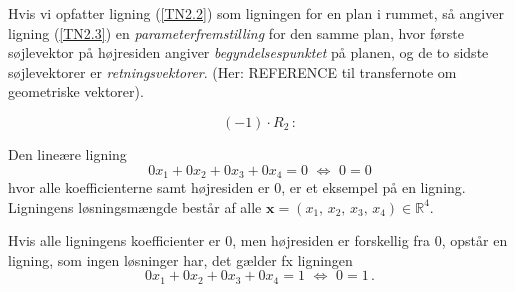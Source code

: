\begin{theorem}


\begin{build}
Hvis vi opfatter ligning (\ref{TN2.2}) som ligningen for en plan i rummet, så angiver ligning (\ref{TN2.3}) en \textit{parameterfremstilling} for den samme plan, hvor første søjlevektor på højresiden angiver \textit{begyndelsespunktet} på planen, og de to sidste søjlevektorer er \textit{retningsvektorer}. (Her: REFERENCE til transfernote om geometriske vektorer).
\end{build}
\end{theorem}





\begin{equation}
(-1)\cdot R_2\,: 
\end{equation}




\begin{example}\label{TN2.2}
Den lineære ligning
\begin{equation}
0x_1+0x_2+0x_3+0x_4=0\,\,\Leftrightarrow\,\,0=0
\end{equation}
hvor alle koefficienterne samt højresiden er 0, er et eksempel på en  ligning. Ligningens løsningsmængde består af alle $\mathbf x=(x_1,\,x_2,\,x_3,\,x_4) \in \mathbb R^4$.\bs

Hvis alle ligningens koefficienter er 0, men højresiden er forskellig fra 0, opstår en  ligning, som ingen løsninger har, det gælder fx ligningen
\begin{equation}
0x_1+0x_2+0x_3+0x_4=1\,\,\Leftrightarrow\,\,0=1\,.
\end{equation}

\end{example}



